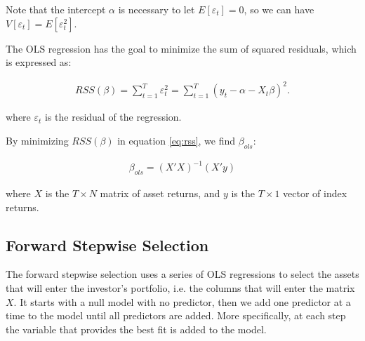 \documentclass[12pt,oneside,a4paper]{memoir}
\begin{document}
\noindent
Note that the intercept $\alpha$ is necessary to let $E[\varepsilon_{t}]=0$, so we can have $V[\varepsilon_{t}] = E[\varepsilon_{t}^2]$.

The OLS regression has the goal to minimize the sum of squared residuals, which is expressed as:

\vspace{-18 pt}
\begin{align} \label{eq:rss}
	RSS(\beta)
	= \sum_{t=1}^{T} \varepsilon_t^2
	= \sum_{t=1}^{T} (y_t - \alpha - X_t \beta)^2.
\end{align}

\noindent
where $\varepsilon_{t}$ is the residual of the regression.

By minimizing $RSS(\beta)$ in equation \eqref{eq:rss}, we find $\beta_{ols}$:

\vspace{-18 pt}
\begin{align} 
	\label{eq:bols}
	\beta_{ols} = (X'X)^{-1}(X'y)
\end{align}

\noindent
where $X$ is the $T \times N$ matrix of asset returns, and $y$ is the $T\times 1$ vector of index returns.



\subsection{Forward Stepwise Selection}

The forward stepwise selection uses a series of OLS regressions to select the assets that will enter the investor's portfolio, i.e. the columns that will enter the matrix $X$.
It starts with a null model with no predictor, then we add one predictor at a time to the model until all predictors are added.
More specifically, at each step the variable that provides the best fit is added to the model.
\end{document}
